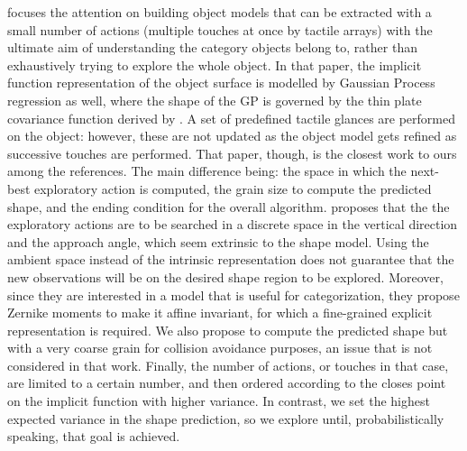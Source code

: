 \citet{Bjorkman2013Enhancing} focuses the attention on building object models that can be extracted with a small number of actions (multiple touches at once by tactile arrays) with the ultimate aim of understanding the category objects belong to, rather than exhaustively trying to explore the whole object. In that paper, the implicit function representation of the object surface is modelled by Gaussian Process regression as well, where the shape of the GP is governed by the thin plate covariance function derived by \citet{Williams2007Gaussian}. A set of predefined tactile glances are performed on the object: however, these are not updated as the object model gets refined as successive touches are performed. That paper, though, is the closest work to ours among the references. The main difference being: the space in which the next-best exploratory action is computed, the grain size to compute the predicted shape, and the ending condition for the overall algorithm.
\citet{Bjorkman2013Enhancing}
proposes that the the exploratory actions are to be searched in a discrete space in the vertical direction and the approach angle, which seem extrinsic to the shape model. Using the ambient space instead of the intrinsic representation does not guarantee that the new observations will be on the desired shape region to be explored. Moreover, since they are interested in a model that is useful for categorization, they propose Zernike moments to make it affine invariant, for which a fine-grained explicit representation is required. We also propose to compute the predicted shape but with a very coarse grain for collision avoidance purposes, an issue that is not considered in that work. Finally, the number of actions, or touches in that case, are limited to a certain number, and then ordered according to the closes point on the implicit function with higher variance. In contrast, we set the highest expected variance in the shape prediction, so we explore until, probabilistically speaking, that goal is achieved.
